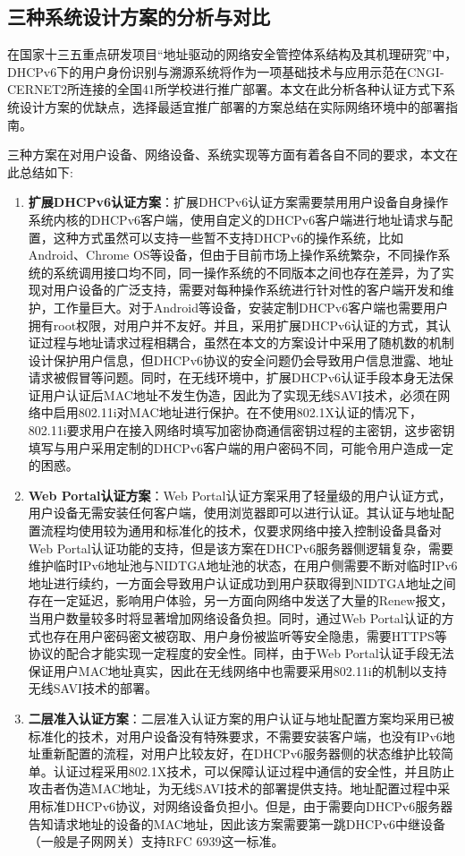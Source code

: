     
    \subsection{三种系统设计方案的分析与对比}
    \label{NIDTGA:DHCPv6:comparison}
    在国家十三五重点研发项目“地址驱动的网络安全管控体系结构及其机理研究”中，DHCPv6下的用户身份识别与溯源系统将作为一项基础技术与应用示范在CNGI-CERNET2所连接的全国41所学校进行推广部署。本文在此分析各种认证方式下系统设计方案的优缺点，选择最适宜推广部署的方案总结在实际网络环境中的部署指南。
    
    三种方案在对用户设备、网络设备、系统实现等方面有着各自不同的要求，本文在此总结如下:
    \begin{enumerate}[1{)}]
      \item \textbf{扩展DHCPv6认证方案}：扩展DHCPv6认证方案需要禁用用户设备自身操作系统内核的DHCPv6客户端，使用自定义的DHCPv6客户端进行地址请求与配置，这种方式虽然可以支持一些暂不支持DHCPv6的操作系统，比如Android、Chrome OS等设备，但由于目前市场上操作系统繁杂，不同操作系统的系统调用接口均不同，同一操作系统的不同版本之间也存在差异，为了实现对用户设备的广泛支持，需要对每种操作系统进行针对性的客户端开发和维护，工作量巨大。对于Android等设备，安装定制DHCPv6客户端也需要用户拥有root权限，对用户并不友好。并且，采用扩展DHCPv6认证的方式，其认证过程与地址请求过程相耦合，虽然在本文的方案设计中采用了随机数的机制设计保护用户信息，但DHCPv6协议的安全问题仍会导致用户信息泄露、地址请求被假冒等问题。同时，在无线环境中，扩展DHCPv6认证手段本身无法保证用户认证后MAC地址不发生伪造，因此为了实现无线SAVI技术\cite{I-D.bi-savi-wlan}，必须在网络中启用802.11i\cite{IEEE80211i}对MAC地址进行保护。在不使用802.1X认证的情况下，802.11i要求用户在接入网络时填写加密协商通信密钥过程的主密钥，这步密钥填写与用户采用定制的DHCPv6客户端的用户密码不同，可能令用户造成一定的困惑。
      \item \textbf{Web Portal认证方案}：Web Portal认证方案采用了轻量级的用户认证方式，用户设备无需安装任何客户端，使用浏览器即可以进行认证。其认证与地址配置流程均使用较为通用和标准化的技术，仅要求网络中接入控制设备具备对Web Portal认证功能的支持，但是该方案在DHCPv6服务器侧逻辑复杂，需要维护临时IPv6地址池与NIDTGA地址池的状态，在用户侧需要不断对临时IPv6地址进行续约，一方面会导致用户认证成功到用户获取得到NIDTGA地址之间存在一定延迟，影响用户体验，另一方面向网络中发送了大量的Renew报文，当用户数量较多时将显著增加网络设备负担。同时，通过Web Portal认证的方式也存在用户密码密文被窃取、用户身份被监听等安全隐患，需要HTTPS等协议的配合才能实现一定程度的安全性。同样，由于Web Portal认证手段无法保证用户MAC地址真实，因此在无线网络中也需要采用802.11i的机制以支持无线SAVI技术的部署。
      \item \textbf{二层准入认证方案}：二层准入认证方案的用户认证与地址配置方案均采用已被标准化的技术，对用户设备没有特殊要求，不需要安装客户端，也没有IPv6地址重新配置的流程，对用户比较友好，在DHCPv6服务器侧的状态维护比较简单。认证过程采用802.1X技术，可以保障认证过程中通信的安全性，并且防止攻击者伪造MAC地址，为无线SAVI技术的部署提供支持。地址配置过程中采用标准DHCPv6协议，对网络设备负担小。但是，由于需要向DHCPv6服务器告知请求地址的设备的MAC地址，因此该方案需要第一跳DHCPv6中继设备（一般是子网网关）支持RFC 6939这一标准。
    \end{enumerate}

